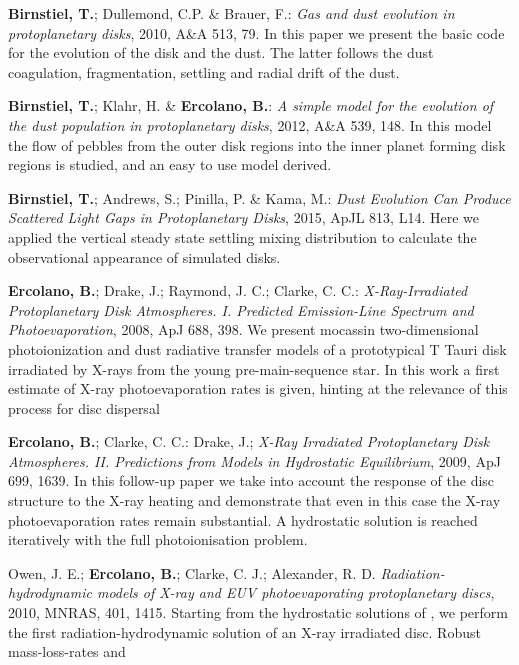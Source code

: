 \documentclass[10pt,fleqn,twoside]{article}
\begin{document}
\begin{literature}
\item {\bf Birnstiel, T.}; Dullemond, C.P. \& Brauer, F.: \textit{Gas and
dust evolution in protoplanetary disks}, 2010, A\&A 513, 79. In this paper we
  present the basic code for the evolution of the disk and the dust. The
  latter follows the dust coagulation, fragmentation, settling and radial
  drift of the dust.
\item{\bf Birnstiel, T.}; Klahr, H. \& {\bf Ercolano, B.}: \textit{A simple model
for the evolution of the dust population in protoplanetary disks}, 
  2012, A\&A 539, 148. In this model the flow of pebbles from the outer
  disk regions into the inner planet forming disk regions is studied,
  and an easy to use model derived.
\item {\bf Birnstiel, T.}; Andrews, S.; Pinilla, P. \& Kama, M.:
\textit{Dust Evolution Can Produce Scattered Light Gaps in Protoplanetary Disks},
2015, ApJL 813, L14. Here we applied the vertical steady state
settling mixing distribution to calculate the observational appearance
of simulated disks.
\item {\bf Ercolano, B.}; Drake, J.; Raymond, J. C.; Clarke, C. C.:
\textit{X-Ray-Irradiated Protoplanetary Disk Atmospheres. I. Predicted Emission-Line Spectrum and Photoevaporation},
2008, ApJ 688, 398. We present mocassin two-dimensional
photoionization and dust radiative transfer models of a prototypical T
Tauri disk irradiated by X-rays from the young pre-main-sequence
star. In this work a first estimate of X-ray photoevaporation rates is
given, hinting at the relevance of this process for disc dispersal
\item {\bf Ercolano, B.}; Clarke, C. C.: Drake, J.;
\textit{X-Ray Irradiated Protoplanetary Disk Atmospheres. II. Predictions from Models in Hydrostatic Equilibrium},
2009, ApJ 699, 1639. In this follow-up paper we take into account the
response of the disc structure to the X-ray heating and demonstrate
that even in this case the X-ray photoevaporation rates remain
substantial. A hydrostatic solution is reached iteratively with the
full photoionisation problem. 
\item Owen, J. E.; {\bf Ercolano, B.}; Clarke, C. J.; Alexander, R. D.
\textit{Radiation-hydrodynamic models of X-ray and EUV photoevaporating protoplanetary discs},
2010, MNRAS, 401, 1415. Starting from the hydrostatic solutions of
\citet{2009ApJ...699.1639E}, we perform the first radiation-hydrodynamic
solution of an X-ray irradiated disc. Robust mass-loss-rates and

\end{literature}
\end{document}
